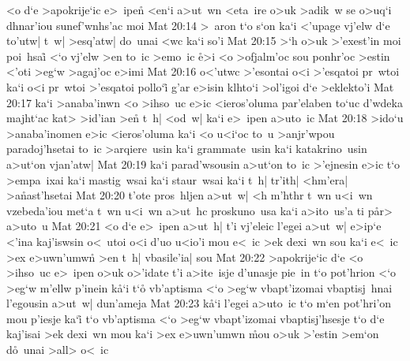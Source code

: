 <o
d`e
>apokrije`ic
e>~ipen\r{}
<en`i
a>ut~wn
<eta~ire
o>uk
>adik~w
se
o>uq`i
dhnar'iou
sunef'wnhs'ac
moi\bibvsend
\vs Mat 20:14
>~aron
t`o
s`on
ka`i
<'upage
vj'elw
d`e
to'utw|
t~w|
>esq'atw|
do~unai
<wc
ka`i
so'i\bibvsend
\vs Mat 20:15
>`h
o>uk
>'exest'in
moi
poi~hsai\r{}
<`o
vj'elw
>en
to~ic
>emo~ic
\r{e}>i
<o
>ofjalm'oc
sou
ponhr'oc
>estin
<'oti
>eg`w
>agaj'oc
e>imi\bibvsend
\vs Mat 20:16
o<'utwc
>'esontai
o<i
>'esqatoi
pr~wtoi
ka`i
o<i
pr~wtoi
>'esqatoi
pollo`i\r{}
g'ar
e>isin
klhto`i
>ol'igoi
d`e
>eklekto'i\bibvsend
\vs Mat 20:17
ka`i
>anaba'inwn
<o
>ihso~uc
e>ic
<ieros'oluma
par'elaben
to`uc
d'wdeka
majht`ac
kat>
>id'ian
>en\r{}
t~h|
<od~w|
ka`i
e>~ipen
a>uto~ic\bibvsend
\vs Mat 20:18
>ido`u
>anaba'inomen
e>ic
<ieros'oluma
ka`i
<o
u<i`oc
to~u
>anjr'wpou
paradoj'hsetai
to~ic
>arqiere~usin
ka`i
grammate~usin
ka`i
katakrino~usin
a>ut`on
vjan'atw|\bibvsend
\vs Mat 20:19
ka`i
parad'wsousin
a>ut`on
to~ic
>'ejnesin
e>ic
t`o
>empa~ixai
ka`i
mastig~wsai
ka`i
staur~wsai
ka`i
t~h|
tr'ith|
<hm'era|
>a\r{n}ast'hsetai\bibvsend
{}
\vs Mat 20:20
t'ote
pros~hljen
a>ut~w|
<h
m'hthr
t~wn
u<i~wn
vzebeda'iou
met`a
t~wn
u<i~wn
a>ut~hc
proskuno~usa
ka`i
a>ito~us'a
ti
p\r{a}r>
a>uto~u\bibvsend
\vs Mat 20:21
<o
d`e
e>~ipen
a>ut~h|
t'i
vj'eleic
l'egei
a>ut~w|
e>ip`e
<'ina
kaj'iswsin
o<~utoi
o<i
d'uo
u<io'i
mou
e<~ic
>ek
dexi~wn
sou
ka`i
e<~ic
>ex
e>uwn'umw\r{n}
>en
t~h|
vbasile'ia|
sou\bibvsend
\vs Mat 20:22
>apokrije`ic
d`e
<o
>ihso~uc
e>~ipen
o>uk
o>'idate
t'i
a>ite~isje
d'unasje
pie~in
t`o
pot'hrion
<`o
>eg`w
m'ellw
p'inein
k\r{a}`i
t`o\r{}
vb'aptisma
<`o
>eg`w
vbapt'izomai
vbaptisj~hnai
l'egousin
a>ut~w|
dun'ameja\bibvsend
\vs Mat 20:23
k\r{a}`i
l'egei
a>uto~ic
t`o
m`en
pot'hri'on
mou
p'iesje
ka`i\r{}
t`o
vb'aptisma
<`o
>eg`w
vbapt'izomai
vbaptisj'hsesje
t`o
d`e
kaj'isai
>ek
dexi~wn
mou
ka`i
>ex
e>uwn'umwn
\r{m}ou
o>uk
>'estin
>em`on
d\r{o}~unai
>all>
o<~ic
